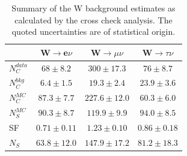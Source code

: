 
\begin{table}[!htb]
\centering
\begin{tabular}{|l|c|c|c|}
\hline
 & W$\rightarrow$e$\nu$ & W$\rightarrow\mu\nu$ & W$\rightarrow\tau\nu$ \\
\hline\hline
$N_{C}^{data}$ & $  68 \pm 8.2$ & $300   \pm 17.3$ & $76  \pm 8.7$ \\
$N_{C}^{bkg}$  & $ 6.4 \pm 1.5$ & $19.3  \pm  2.4$ & $23.9\pm 3.6$ \\
$N_{C}^{MC}$   & $87.3 \pm 7.7$ & $227.6 \pm 12.0$ & $60.3\pm 6.0$ \\
$N_{S}^{MC}$   & $90.3 \pm 8.7$ & $119.9 \pm  9.9$ & $94.0\pm 8.5$ \\
\hline\hline               
SF             & $0.71\pm0.11$ & $1.23\pm0.10$   & $0.86\pm0.18$ \\
\hline\hline
$N_{S}$        & $63.8\pm12.0$ & $147.9\pm 17.2$ & $81.2\pm18.3$ \\
\hline
\end{tabular}
\caption[Summary of the W background estimates as calculated by the cross check analysis.]
{Summary of the W background estimates as calculated by the cross check analysis. The quoted uncertainties are of statistical origin.}
\label{TABLE:ParkedDataAnalysis_WBackground_Summary}
\end{table}

